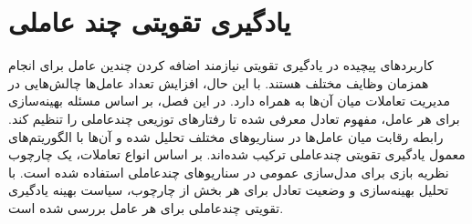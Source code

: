 \chapter{یادگیری تقویتی چند عاملی}
کاربردهای پیچیده در یادگیری تقویتی نیازمند اضافه کردن چندین عامل برای انجام همزمان وظایف مختلف هستند.
با این حال، افزایش تعداد عامل‌ها چالش‌هایی در مدیریت تعاملات میان آن‌ها به همراه دارد.
در این فصل، بر اساس مسئله بهینه‌سازی برای هر عامل، مفهوم تعادل معرفی شده تا رفتارهای توزیعی چندعاملی را تنظیم کند.
رابطه رقابت میان عامل‌ها در سناریوهای مختلف تحلیل شده و آن‌ها با الگوریتم‌های معمول یادگیری تقویتی چندعاملی ترکیب شده‌اند. بر اساس انواع تعاملات، یک چارچوب نظریه بازی برای مدل‌سازی عمومی در سناریوهای چندعاملی استفاده شده است. با تحلیل بهینه‌سازی و وضعیت تعادل برای هر بخش از چارچوب، سیاست بهینه یادگیری تقویتی چندعاملی برای هر عامل بررسی شده است.




  
    
    
    
%    
%    
    